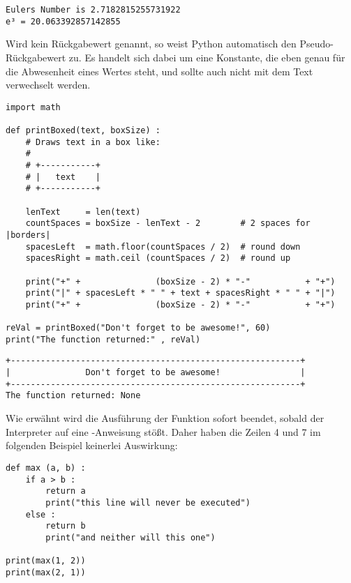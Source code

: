 \begin{cmdbox}
\begin{verbatim}
Eulers Number is 2.7182815255731922
e³ = 20.063392857142855
\end{verbatim}
\end{cmdbox}

Wird kein Rückgabewert genannt, so weist Python automatisch den Pseudo-Rückgabewert  zu. Es handelt sich dabei um eine Konstante, die eben genau für die Abwesenheit eines Wertes steht, und sollte auch nicht mit dem Text  verwechselt werden.
\begin{codebox}
\begin{verbatim}
import math

def printBoxed(text, boxSize) :
    # Draws text in a box like:
    #
    # +-----------+
    # |   text    |
    # +-----------+
  
    lenText     = len(text)
    countSpaces = boxSize - lenText - 2        # 2 spaces for |borders|
    spacesLeft  = math.floor(countSpaces / 2)  # round down
    spacesRight = math.ceil (countSpaces / 2)  # round up
  
    print("+" +               (boxSize - 2) * "-"           + "+")
    print("|" + spacesLeft * " " + text + spacesRight * " " + "|")
    print("+" +               (boxSize - 2) * "-"           + "+")
  
reVal = printBoxed("Don't forget to be awesome!", 60)
print("The function returned:" , reVal)
\end{verbatim}
\end{codebox}

\begin{cmdbox}
\begin{verbatim}
+----------------------------------------------------------+
|               Don't forget to be awesome!                |
+----------------------------------------------------------+
The function returned: None
\end{verbatim}
\end{cmdbox}

Wie erwähnt wird die Ausführung der Funktion sofort beendet, sobald der Interpreter auf eine -Anweisung stößt. Daher haben die Zeilen 4 und 7 im folgenden Beispiel keinerlei Auswirkung:
\begin{codebox}
\begin{verbatim}
def max (a, b) :
    if a > b :
        return a
        print("this line will never be executed")
    else :
        return b
        print("and neither will this one")

print(max(1, 2))
print(max(2, 1))
\end{verbatim}
\end{codebox}

